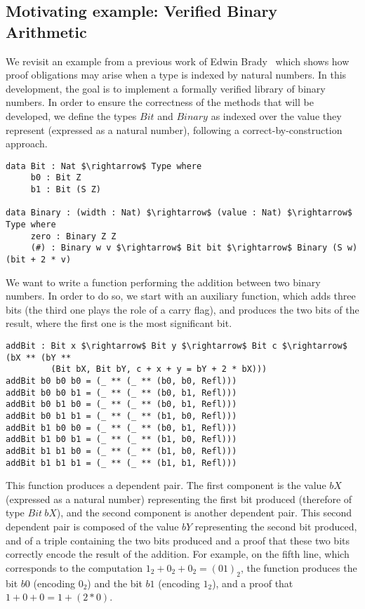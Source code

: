 \subsection{Motivating example: Verified Binary Arithmetic}
\label{sect:motivatingExample}

We revisit an example from a previous work of Edwin Brady~\cite{bradytfp07} which shows how proof obligations may arise when a type is indexed by natural numbers. In this development, the goal is to implement a formally verified library of binary numbers. In order to ensure the correctness of the methods that will be developed, we define the types $Bit$ and $Binary$ as indexed over the value they represent (expressed as a natural number), following a correct-by-construction approach.

\begin{lstlisting}
data Bit : Nat $\rightarrow$ Type where
     b0 : Bit Z
     b1 : Bit (S Z)
     
data Binary : (width : Nat) $\rightarrow$ (value : Nat) $\rightarrow$ Type where
     zero : Binary Z Z
     (#) : Binary w v $\rightarrow$ Bit bit $\rightarrow$ Binary (S w) (bit + 2 * v)
\end{lstlisting}

We want to write a function performing the addition between two binary numbers. In order to do so, we start with an auxiliary function, which adds three bits
(the third one plays the role of a carry flag), and produces the two bits of
the result, where the first one is the most significant bit. 

\begin{lstlisting}
addBit : Bit x $\rightarrow$ Bit y $\rightarrow$ Bit c $\rightarrow$ (bX ** (bY ** 
         (Bit bX, Bit bY, c + x + y = bY + 2 * bX)))
addBit b0 b0 b0 = (_ ** (_ ** (b0, b0, Refl)))
addBit b0 b0 b1 = (_ ** (_ ** (b0, b1, Refl)))
addBit b0 b1 b0 = (_ ** (_ ** (b0, b1, Refl)))
addBit b0 b1 b1 = (_ ** (_ ** (b1, b0, Refl)))
addBit b1 b0 b0 = (_ ** (_ ** (b0, b1, Refl)))
addBit b1 b0 b1 = (_ ** (_ ** (b1, b0, Refl)))
addBit b1 b1 b0 = (_ ** (_ ** (b1, b0, Refl)))
addBit b1 b1 b1 = (_ ** (_ ** (b1, b1, Refl)))
\end{lstlisting}

This function produces a dependent pair. The first component is the value $bX$ (expressed as a natural number) representing the first bit produced (therefore of type $Bit\ bX$), and the second component is another dependent pair. This second dependent pair is composed of the value $bY$ representing the second bit produced, and of a triple containing the two bits produced and a proof that these two bits correctly encode the result of the addition.
For example, on the fifth line, which corresponds to the computation $1_2 + 0_2 + 0_2 = (01)_2$, the function produces the bit $b0$ (encoding $0_2$) and the bit $b1$ (encoding $1_2$), and a proof that $1 + 0 + 0 = 1 + (2*0)$.


